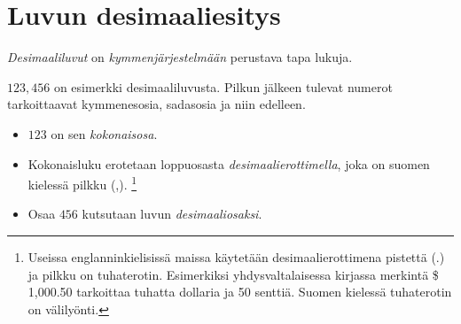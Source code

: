 \section{Luvun desimaaliesitys}

\emph{Desimaaliluvut} on \emph{kymmenjärjestelmään} perustava tapa lukuja.

$123,456$ on esimerkki desimaaliluvusta. Pilkun jälkeen tulevat numerot tarkoittaavat kymmenesosia, sadasosia ja niin edelleen.

\begin{itemize}
	\item $123$ on sen \emph{kokonaisosa}.
	\item Kokonaisluku erotetaan loppuosasta \emph{desimaalierottimella}, joka on suomen kielessä pilkku (,).
	\footnote{Useissa englanninkielisissä maissa käytetään desimaalierottimena pistettä (.) ja pilkku on tuhaterotin. Esimerkiksi yhdysvaltalaisessa kirjassa merkintä \$ 1,000.50 tarkoittaa tuhatta dollaria ja 50 senttiä. Suomen kielessä tuhaterotin on välilyönti.}
	\item Osaa $456$ kutsutaan luvun \emph{desimaaliosaksi}.
\end{itemize}



